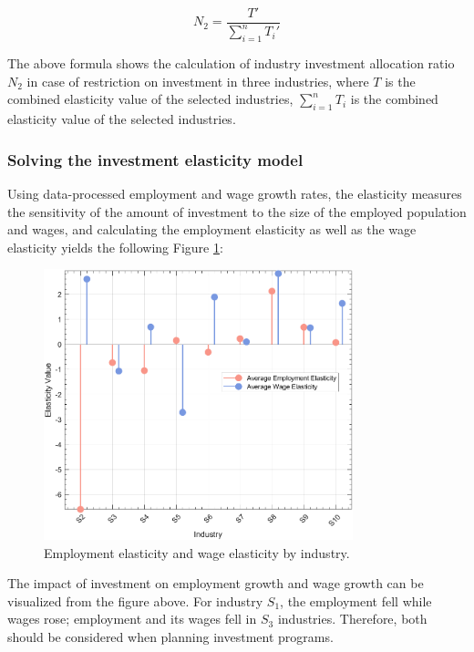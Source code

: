 \documentclass[12pt]{article}  %
\begin{document}
		\begin{equation}
			N_2 = \frac{T'}{\sum_{i=1}^{n} T_i'}
		\end{equation}

	The above formula shows the calculation of industry investment allocation ratio $N_2$ in case of restriction on investment in three industries, where $T$ is the combined elasticity value of the selected industries, $\sum\limits_{i = 1}^n {{T_i}} $ is the combined elasticity value of the selected industries.
	
\subsubsection{Solving the investment elasticity model}

	Using data-processed employment and wage growth rates, the elasticity measures the sensitivity of the amount of investment to the size of the employed population and wages, and calculating the employment elasticity as well as the wage elasticity yields the following Figure \ref{q4_tanxing_work_wage}:
	
		\begin{figure}[H] %
		\centering
		\includegraphics[width=0.8\textwidth]{img/q4_tanxing_work_wage} %
		\caption{Employment elasticity and wage elasticity by industry.} %
		\label{q4_tanxing_work_wage} %
	\end{figure}

	The impact of investment on employment growth and wage growth can be visualized from the figure above. For industry $S_1$, the employment fell while wages rose; employment and its wages fell in $S_3$ industries. Therefore, both should be considered when planning investment programs.
	
\end{document}
